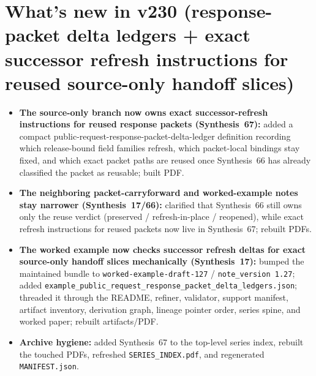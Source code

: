 \documentclass[11pt]{article}
\begin{document}
\section{What's new in v230 (response-packet delta ledgers + exact successor refresh instructions for reused source-only handoff slices)}
\begin{itemize}[leftmargin=*]
\item \textbf{The source-only branch now owns exact successor-refresh instructions for reused response packets (Synthesis~67):} added a compact public-request-response-packet-delta-ledger definition recording which release-bound field families refresh, which packet-local bindings stay fixed, and which exact packet paths are reused once Synthesis~66 has already classified the packet as reusable; built PDF.
\item \textbf{The neighboring packet-carryforward and worked-example notes stay narrower (Synthesis~17/66):} clarified that Synthesis~66 still owns only the reuse verdict (preserved / refresh-in-place / reopened), while exact refresh instructions for reused packets now live in Synthesis~67; rebuilt PDFs.
\item \textbf{The worked example now checks successor refresh deltas for exact source-only handoff slices mechanically (Synthesis~17):} bumped the maintained bundle to \texttt{worked-example-draft-127} / \texttt{note\_version 1.27}; added \texttt{example\_public\_request\_response\_packet\_delta\_ledgers.json}; threaded it through the README, refiner, validator, support manifest, artifact inventory, derivation graph, lineage pointer order, series spine, and worked paper; rebuilt artifacts/PDF.
\item \textbf{Archive hygiene:} added Synthesis~67 to the top-level series index, rebuilt the touched PDFs, refreshed \texttt{SERIES\_INDEX.pdf}, and regenerated \texttt{MANIFEST.json}.
\end{itemize}
\end{document}
